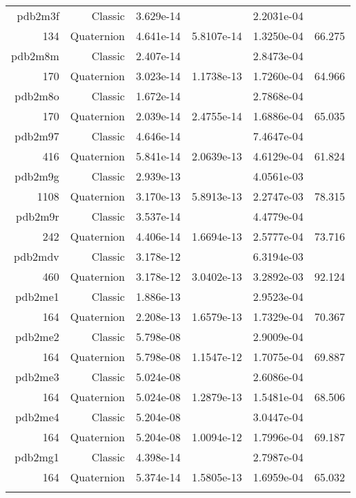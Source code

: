 \begin{xltabular}{\textwidth}{r|rS[table-format=1.3e+2]S[table-format=1.4e+2]S[table-format=1.4e+2]S[table-format=-1.3]}
pdb2m3f & Classic & 3.629e-14 &  & 2.2031e-04 & \\
134 & Quaternion & 4.641e-14 & 5.8107e-14 & 1.3250e-04 & 66.275\\  \addlinespace
pdb2m8m & Classic & 2.407e-14 &  & 2.8473e-04 & \\
170 & Quaternion & 3.023e-14 & 1.1738e-13 & 1.7260e-04 & 64.966\\  \addlinespace
pdb2m8o & Classic & 1.672e-14 &  & 2.7868e-04 & \\
170 & Quaternion & 2.039e-14 & 2.4755e-14 & 1.6886e-04 & 65.035\\  \addlinespace
pdb2m97 & Classic & 4.646e-14 &  & 7.4647e-04 & \\
416 & Quaternion & 5.841e-14 & 2.0639e-13 & 4.6129e-04 & 61.824\\  \addlinespace
pdb2m9g & Classic & 2.939e-13 &  & 4.0561e-03 & \\
1108 & Quaternion & 3.170e-13 & 5.8913e-13 & 2.2747e-03 & 78.315\\  \addlinespace
pdb2m9r & Classic & 3.537e-14 &  & 4.4779e-04 & \\
242 & Quaternion & 4.406e-14 & 1.6694e-13 & 2.5777e-04 & 73.716\\  \addlinespace
pdb2mdv & Classic & 3.178e-12 &  & 6.3194e-03 & \\
460 & Quaternion & 3.178e-12 & 3.0402e-13 & 3.2892e-03 & 92.124\\  \addlinespace
pdb2me1 & Classic & 1.886e-13 &  & 2.9523e-04 & \\
164 & Quaternion & 2.208e-13 & 1.6579e-13 & 1.7329e-04 & 70.367\\  \addlinespace
pdb2me2 & Classic & 5.798e-08 &  & 2.9009e-04 & \\
164 & Quaternion & 5.798e-08 & 1.1547e-12 & 1.7075e-04 & 69.887\\  \addlinespace
pdb2me3 & Classic & 5.024e-08 &  & 2.6086e-04 & \\
164 & Quaternion & 5.024e-08 & 1.2879e-13 & 1.5481e-04 & 68.506\\  \addlinespace
pdb2me4 & Classic & 5.204e-08 &  & 3.0447e-04 & \\
164 & Quaternion & 5.204e-08 & 1.0094e-12 & 1.7996e-04 & 69.187\\  \addlinespace
pdb2mg1 & Classic & 4.398e-14 &  & 2.7987e-04 & \\
164 & Quaternion & 5.374e-14 & 1.5805e-13 & 1.6959e-04 & 65.032\\  \addlinespace

\end{xltabular}
